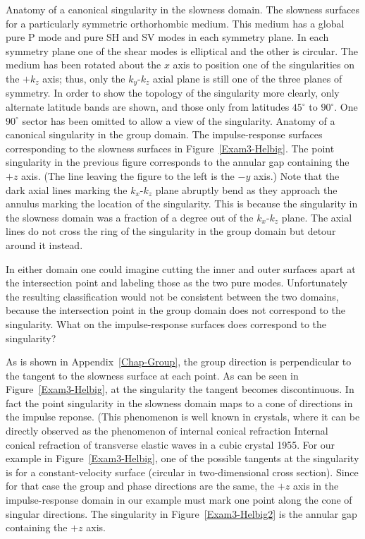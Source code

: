 {Anatomy of a canonical singularity in the slowness domain.}
{
The {\qS} slowness surfaces for a particularly symmetric orthorhombic
medium. This medium has a global pure P mode and pure SH and SV modes
in each symmetry plane. In each symmetry plane one of
the shear modes is elliptical and the other is circular.
The medium has been rotated about the $x$ axis to position one
of the singularities on the $+k_z$ axis; thus, only the $k_y$-$k_z$
axial plane is still one of the three planes of symmetry.
In order to show the topology of the singularity more clearly,
only alternate latitude bands are shown, and those only
from latitudes $45^\circ$ to $90^\circ$.
One $90^\circ$ sector has been omitted to allow a view of the singularity.
}
{Anatomy of a canonical singularity in the group domain.}
{
The {\qS} impulse-response surfaces corresponding to the slowness surfaces
in Figure~\protect\ref{Exam3-Helbig}. The point singularity in the
previous figure corresponds to the annular gap containing the $+z$ axis.
(The line leaving the figure to the left is the $-y$ axis.)
Note that the dark axial lines marking the $k_x$-$k_z$ plane abruptly bend
as they approach the annulus marking the location of the singularity.
This is because the singularity in the slowness domain was a fraction
of a degree out of the $k_x$-$k_z$ plane. The axial lines
do not cross the ring of the singularity in the group domain
but detour around it instead.
}

In either domain one could imagine cutting the inner and outer
surfaces apart at the intersection point and labeling
those as the two {\qS} pure modes.
Unfortunately the resulting classification would not be consistent
between the two domains, because the intersection point in
the group domain does not correspond to the singularity.
What on the impulse-response surfaces does correspond to the singularity?

As is shown in Appendix~\ref{Chap-Group},
the group direction is perpendicular to the tangent to the slowness surface
at each point. As can be seen in Figure~\ref{Exam3-Helbig},
at the singularity the tangent becomes discontinuous.
In fact the point singularity in the slowness domain maps
to a cone of directions in the impulse reponse.
(This phenomenon is well known in crystals,
where it can be directly observed
as the phenomenon of internal conical refraction
{Internal conical refraction of transverse elastic waves in a cubic crystal}
{1955}.
For our example in Figure~\ref{Exam3-Helbig},
one of the possible tangents at the singularity
is for a constant-velocity surface
(circular in two-dimensional cross section).
Since for that case the group and phase directions are the same,
the $+z$ axis in the impulse-response domain in our example
must mark one point along the cone of singular directions.
The singularity in Figure~\ref{Exam3-Helbig2}
is the annular gap containing the $+z$ axis.

